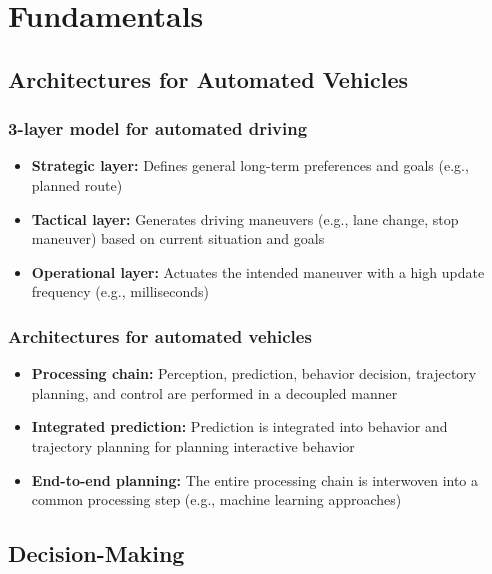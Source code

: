 
\section{Fundamentals}
\subsection{Architectures for Automated Vehicles}

\subsubsection*{3-layer model for automated driving}
\begin{itemize}
    \item \textbf{Strategic layer:} Defines general long-term preferences and goals (e.g., planned route)
    \item \textbf{Tactical layer:} Generates driving maneuvers (e.g., lane change, stop maneuver) based on current situation and goals
    \item \textbf{Operational layer:} Actuates the intended maneuver with a high update frequency (e.g., milliseconds)
\end{itemize}

\subsubsection*{Architectures for automated vehicles}
\begin{itemize}
    \item \textbf{Processing chain:} Perception, prediction, behavior decision, trajectory planning, and control are performed in a decoupled manner
    \item \textbf{Integrated prediction:} Prediction is integrated into behavior and trajectory planning for planning interactive behavior
    \item \textbf{End-to-end planning:} The entire processing chain is interwoven into a common processing step (e.g., machine learning approaches)
\end{itemize}

\subsection{Decision-Making}

